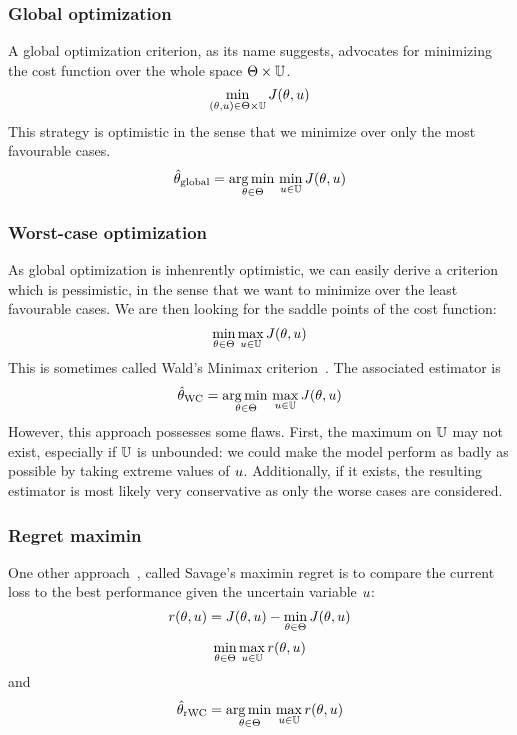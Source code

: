 \documentclass[../../Main_ManuscritThese.tex]{subfiles}
\begin{document}
\subsubsection{Global optimization}
A global optimization criterion, as its name suggests, advocates for minimizing the cost function over the whole space $\Theta \times \mathbb{U}$. 
\begin{equation}
  \min_{(\theta,u) \in \Theta \times \mathbb{U}} J(\theta, u)
\end{equation}
 This strategy is optimistic in the sense that we minimize over only the most favourable cases.
\begin{equation}
  \label{eq:kkglobal}
  \hat{\theta}_{\mathrm{global}} = \operatorname*{arg\,min \,}_{\theta \in \Theta} \min_{u \in \mathbb{U}} J(\theta, u)
\end{equation}

\subsubsection{Worst-case optimization}
\label{sec:saddle_point}
As global optimization is inhenrently optimistic, we can easily derive a criterion which is pessimistic, in the sense that we want to minimize over the least favourable cases. We are then looking for the saddle points of the cost function:
\begin{equation}
  \min_{\theta\in\Theta} \max_{u \in \mathbb{U}} J(\theta,u)
\end{equation}
This is sometimes called Wald's Minimax criterion~\cite{wald_statistical_1945}.
The associated estimator is 
\begin{equation}
  \label{eq:kkwc}
  \hat{\theta}_{\mathrm{WC}} =  \operatorname*{arg\,min \,}_{\theta \in \Theta} \max_{u \in \mathbb{U}} J(\theta, u)
\end{equation}
However, this approach possesses some flaws. First, the maximum on $\mathbb{U}$ may not exist, especially if $\mathbb{U}$ is unbounded: we could make the model perform as badly as possible by taking extreme values of $u$. Additionally, if it exists, the resulting estimator is most likely very conservative as only the worse cases are considered.

\subsubsection{Regret maximin}
\label{ssec:regret_savage}
One other approach~\cite{savage_theory_1951}, called Savage's maximin regret is to compare the current loss to the best performance given the uncertain variable $u$:
\begin{equation}
  r(\theta, u) = J(\theta, u) - \min_{\theta \in \Theta} J(\theta, u)
\end{equation}
\begin{equation}
  \min_{\theta \in \Theta} \max_{u \in \mathbb{U}} r(\theta,u)
\end{equation}
and
\begin{equation}
  \hat{\theta}_{\mathrm{rWC}} = \operatorname*{arg\,min \,}_{\theta\in\Theta} \max_{u \in \mathbb{U}} r(\theta, u)
\end{equation}
\end{document}
